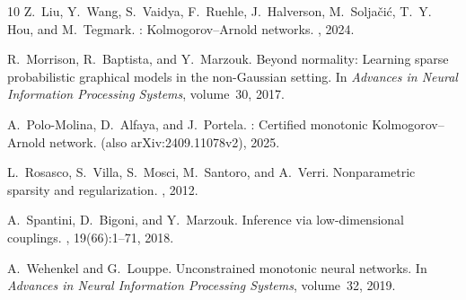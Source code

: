 \documentclass[11pt,a4paper]{article}
\theoremstyle{plain}
\theoremstyle{definition}
\theoremstyle{remark}
\begin{document}
\begin{thebibliography}{10}
Z.~Liu, Y.~Wang, S.~Vaidya, F.~Ruehle, J.~Halverson, M.~Solja{\v{c}}i{\'c}, T.~Y. Hou, and M.~Tegmark.
: {K}olmogorov--{A}rnold networks.
, 2024.

R.~Morrison, R.~Baptista, and Y.~Marzouk.
\newblock Beyond normality: Learning sparse probabilistic graphical models in the non-{G}aussian setting.
\newblock In {\em Advances in Neural Information Processing Systems}, volume~30, 2017.

A.~Polo-Molina, D.~Alfaya, and J.~Portela.
: Certified monotonic {K}olmogorov--{A}rnold network.
 (also arXiv:2409.11078v2), 2025.

L.~Rosasco, S.~Villa, S.~Mosci, M.~Santoro, and A.~Verri.
\newblock Nonparametric sparsity and regularization.
, 2012.

A.~Spantini, D.~Bigoni, and Y.~Marzouk.
\newblock Inference via low-dimensional couplings.
, 19(66):1--71, 2018.

A.~Wehenkel and G.~Louppe.
\newblock Unconstrained monotonic neural networks.
\newblock In {\em Advances in Neural Information Processing Systems}, volume~32, 2019.

\end{thebibliography}
\end{document}
